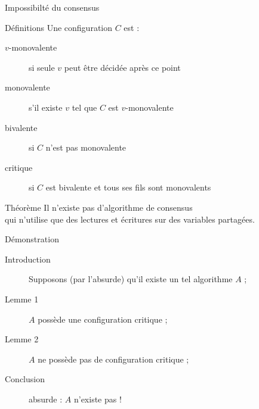 
\begingroup

\begin{frame}[fragile]{Impossibilté du consensus}

  \begin{block}{Définitions}
    Une configuration $C$ est :
    \begin{description}
    \item[$v$-monovalente] si seule $v$ peut être décidée après ce point
    \item[monovalente] s'il existe $v$ tel que $C$ est $v$-monovalente 
    \item[bivalente] si $C$ n'est pas monovalente
    \item[critique] si $C$ est bivalente et tous ses fils sont monovalents
    \end{description}
  \end{block}

  \pause  

  \begin{alertblock}{Théorème}
    Il n'existe pas d'algorithme de consensus\\
    qui n'utilise que des lectures et écritures sur des variables partagées.
  \end{alertblock}

  \begin{exampleblock}{Démonstration}
    \begin{description}
    \item[Introduction] Supposons (par l'absurde) qu'il existe un tel algorithme $A$ ;
    \item[Lemme 1] $A$ possède une configuration critique ;
    \item[Lemme 2] $A$ ne possède pas de configuration critique ;
    \item[Conclusion] absurde : $A$ n'existe pas !
    \end{description}
  \end{exampleblock}

  
\end{frame}

\endgroup
\endinput
